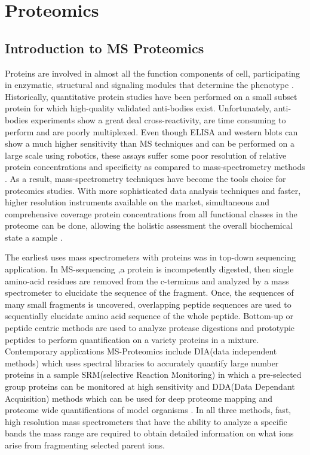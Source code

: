 \documentclass[a4paper]{book}
\begin{document}
	
	
	
	
	\chapter{Proteomics}
	
	\section{Introduction to MS Proteomics}
	Proteins are involved in almost all the function components of cell, participating in enzymatic, structural and signaling modules that determine the phenotype \citep{Hartwell1999FromBiology}. Historically, quantitative protein studies have been performed on a small subset protein for which high-quality validated anti-bodies exist. Unfortunately, anti-bodies experiments show a great deal cross-reactivity, are time consuming to perform and are poorly multiplexed\citep{Solier2014Antibody-basedLimitations}. Even though ELISA and western blots can show a much higher sensitivity than MS techniques and can be performed on a large scale using robotics, these assays suffer some poor resolution of relative protein concentrations and specificity as compared to mass-spectrometry methods \citep{Solier2014Antibody-basedLimitations}. As a result, mass-spectrometry techniques have become the tools choice for proteomics studies. With more sophisticated data analysis techniques and faster, higher resolution instruments available on the market, simultaneous and comprehensive coverage protein concentrations from all functional classes in the proteome can be done, allowing the holistic assessment the overall biochemical state a sample \citep{Schubert2017QuantitativeResearch}.
	
	The earliest uses mass spectrometers with proteins was in top-down sequencing application. In MS-sequencing ,a protein is incompetently digested, then single amino-acid residues are removed from the c-terminus and analyzed by a mass spectrometer to elucidate the sequence of the fragment. Once, the sequences of many small fragments is uncovered, overlapping peptide sequences are used to sequentially elucidate amino acid sequence of the whole peptide\citep{Steen2004TheSequencing}. Bottom-up or peptide centric methods are used to analyze protease digestions and prototypic peptides to perform quantification on a variety proteins in a mixture. Contemporary applications MS-Proteomics include DIA(data independent methods) which uses spectral libraries to accurately quantify large number proteins in a sample SRM(selective Reaction Monitoring) in which a pre-selected group proteins can be monitored at high sensitivity\citep{Picotti2012SelectedDirections} and DDA(Data Dependant Acquisition) methods which can be used for deep proteome mapping \citep{Nagaraj2011DeepLine.} and proteome wide quantifications of model organisms \citep{deGodoy2008ComprehensiveYeast}. In all three methods, fast, high resolution mass spectrometers that have the ability to analyze a specific bands the mass range are required to obtain detailed information on what ions arise from fragmenting selected parent ions.
	
\end{document}
